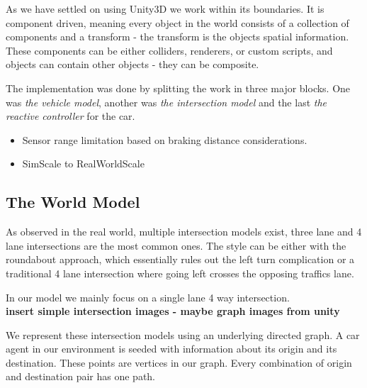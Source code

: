 As we have settled on using Unity3D we work within its boundaries.
It is component driven, meaning every object in the world consists of a collection of components and a transform - the transform is the objects spatial information.
These components can be either colliders, renderers, or custom scripts, and objects can contain other objects - they can be composite.

The implementation was done by splitting the work in three major blocks. One was \textit{the vehicle model}, another was \textit{the intersection model} and the last \textit{the reactive controller} for the car.

\begin{itemize}
\item Sensor range limitation based on braking distance considerations.
\item SimScale to RealWorldScale
\end{itemize}

\subsection{The World Model}
As observed in the real world, multiple intersection models exist, three lane and 4 lane intersections are the most common ones.
The style can be either with the roundabout approach, which essentially rules out the left turn complication or a traditional 4 lane intersection where going left crosses the opposing traffics lane.

In our model we mainly focus on a single lane 4 way intersection.\\
\textbf{insert simple intersection images - maybe graph images from unity}

We represent these intersection models using an underlying directed graph.
 A car agent in our environment is seeded with information about its origin and its destination.
These points are vertices in our graph. 
Every combination of origin and destination pair has one path.

